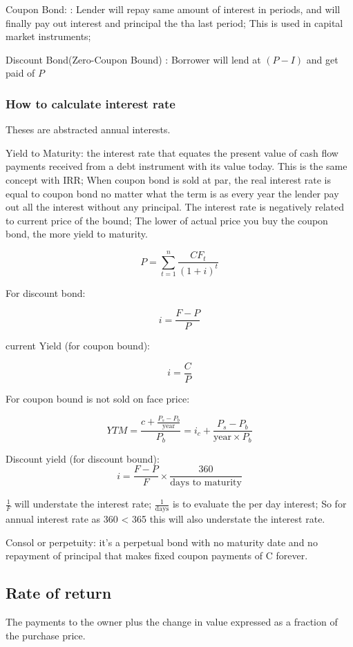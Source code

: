 \documentclass[10pt, a4paper]{article}
\begin{document}
        \quad Coupon Bond: : Lender will repay same amount of interest in periods, and will finally pay out interest and principal the tha last period; This is used in capital market instruments;

        \quad Discount Bond(Zero-Coupon Bound) : Borrower will lend at $(P - I)$ and get paid of $P$  

        \subsubsection{How to calculate interest rate}

            Theses are abstracted annual interests.

            Yield to  Maturity: the interest rate that equates the present value of cash flow payments received from a debt instrument with its value today. This is the same concept with IRR; When coupon bond is sold at par, the real interest rate is equal to coupon bond no matter what the term is as every year the lender pay out all the interest without any principal. The interest rate is negatively related to current price of the bound; The lower of actual price you buy the coupon bond, the more yield to maturity.  

            $$P = \sum_{t = 1}^{n}\frac{CF_t}{(1 + i)^t}$$

            For discount bond: 

            $$i = \frac{F - P}{P}$$

            current Yield (for coupon bound):

            $$i = \frac{C}{P}$$

            For coupon bound is not sold on face price:

            $$YTM =  \frac{c + \frac{P_s - P_b}{\text{year}}}{P_b} = i_c + \frac{P_s - P_b}{\text{year}\times P_b}$$

            Discount yield (for discount bound):
            $$i = \frac{F - P}{F} \times \frac{360}{\text{days to maturity}}$$

            $\frac{1}{F}$ will understate the interest rate; $\frac{1}{\text{days}}$ is to evaluate the per day interest; So for annual interest rate as 360 < 365 this will also understate the interest rate. 

            Consol or perpetuity: it's a perpetual bond with no maturity date and no repayment of principal that makes fixed coupon payments of C forever.
        
        \subsection{Rate of return} 
        The payments to the owner plus the change in value expressed as a fraction of the purchase price. 
\end{document}
